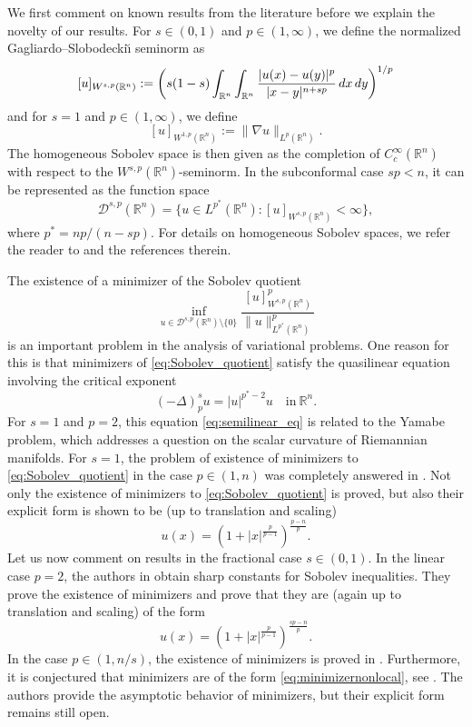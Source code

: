 \documentclass[11pt]{amsart}
\theoremstyle{plain}
\theoremstyle{definition}
\numberwithin{equation}{section}
\renewcommand{\d}{\textnormal{d}}
\newcommand{\R}{\mathbb{R}}
\begin{document}
We first comment on known results from the literature before we explain the novelty of our results. For $s\in(0,1)$ and $p\in (1,\infty)$, we define the
normalized Gagliardo–Slobodecki\u{ı} seminorm as
\[ [u]_{W^{s,p}(\R^n)} := \left(s(1-s) \int_{\R^n}\int_{\R^n} \frac{|u(x)-u(y)|^p}{|x-y|^{n+sp}}\, \d x \, \d y\right)^{1/p} \]
and for $s=1$ and $p\in(1,\infty)$, we define
\[ [u]_{W^{1,p}(\R^n)} := \|\nabla u\|_{L^p(\R^n)}. \]
The homogeneous Sobolev space is then given as the completion of $C_c^{\infty}(\R^n)$ with respect to the $W^{s,p}(\R^n)$-seminorm. In the subconformal case $sp<n$, it can be represented as the function space
 \begin{equation*}
\mathcal{D}^{s, p}(\mathbb{R}^n) = \lbrace u \in L^{p^\ast}(\mathbb{R}^n): [u]_{W^{s, p}(\mathbb{R}^n)} < \infty \rbrace,
\end{equation*}
where $p^\ast = np/(n-sp)$. For details on homogeneous Sobolev spaces, we refer the reader to \cite{BGV} and the references therein.

The existence of a minimizer of the Sobolev quotient
\begin{equation} \label{eq:Sobolev_quotient}
\inf_{u \in \mathcal{D}^{s, p}(\mathbb{R}^n) \setminus \lbrace 0 \rbrace} \frac{[u]_{W^{s, p}(\mathbb{R}^n)}^p}{\|u\|_{L^{p^\ast}(\mathbb{R}^n)}^p}
\end{equation}
is an important problem in the analysis of variational problems. One reason for this is that minimizers of \eqref{eq:Sobolev_quotient} satisfy the quasilinear equation involving the critical exponent
\begin{equation} \label{eq:semilinear_eq}
(-\Delta)^s_p u = |u|^{p^\ast-2}u \quad \text{in}~ \mathbb{R}^n.
\end{equation}
For $s=1$ and $p=2$, this equation \eqref{eq:semilinear_eq} is related to the Yamabe problem, which addresses a question on the scalar curvature of Riemannian manifolds. 
For $s=1$, the problem of existence of minimizers to \eqref{eq:Sobolev_quotient} in the case $p\in(1,n)$ was completely answered in \cite{Aub76c,Tal76}.
Not only the existence of minimizers to \eqref{eq:Sobolev_quotient} is proved, but also their explicit form is shown to be (up to translation and scaling) 
\begin{equation*}
u(x) = \left(1+|x|^{\frac{p}{p-1}}\right)^{\frac{p-n}{p}}.
\end{equation*}
Let us now comment on results in the fractional case $s\in(0,1)$. 
In the linear case $p=2$, the authors in \cite{CT04} obtain sharp constants for Sobolev inequalities. They prove the existence of minimizers and prove that 
they are (again up to translation and scaling) of the form 
\begin{equation} \label{eq:minimizernonlocal}
u(x) = \left(1+|x|^{\frac{p}{p-1}}\right)^{\frac{sp-n}{p}}.
\end{equation}
In the case $p\in(1,n/s)$, the existence of minimizers is proved in \cite{BMS16}.
Furthermore, it is conjectured that minimizers are of the form \eqref{eq:minimizernonlocal}, see \cite[Equation (1.9)]{BMS16}. The authors provide the asymptotic behavior of minimizers, but their explicit form remains still open. 
\end{document}
